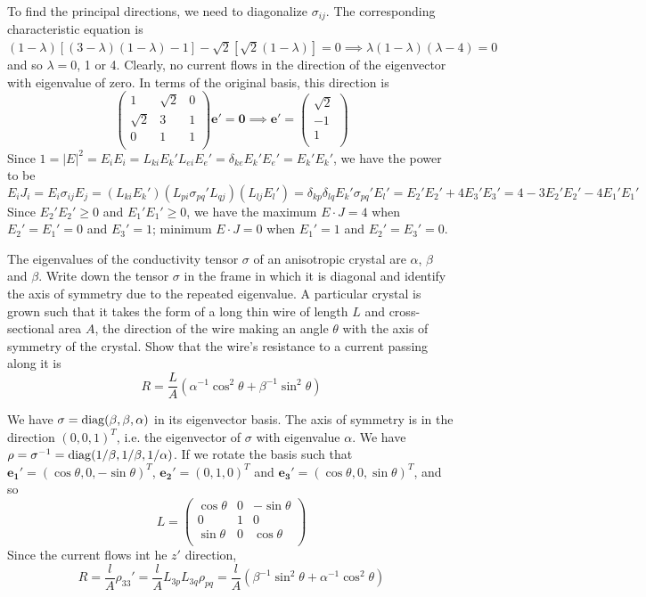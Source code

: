 \documentclass[a4paper]{article}
\begin{document}
\begin{ans}
To find the principal directions, we need to diagonalize $\sigma_{ij}$. The corresponding characteristic equation is $(1-\lambda)[(3-\lambda)(1-\lambda)-1]-\sqrt{2}[\sqrt{2}(1-\lambda)]=0\implies \lambda(1-\lambda)(\lambda-4)=0$ and so $\lambda=0$, 1 or 4. Clearly, no current flows in the direction of the eigenvector with eigenvalue of zero. In terms of the original basis, this direction is
$$\begin{pmatrix}1&\sqrt{2}&0\\\sqrt{2}&3&1\\0&1&1\\\end{pmatrix}\mathbf{e'}=\boldsymbol{0}\implies\mathbf{e'}=\begin{pmatrix}\sqrt{2}\\-1\\1\\\end{pmatrix}$$
Since $1=|E|^2=E_iE_i=L_{ki}E_k'L_{ei}E_e'=\delta_{ke}E_k'E_e'=E_k'E_k'$, we have the power to be
$$E_iJ_i=E_i\sigma_{ij}E_j=(L_{ki}E_k')(L_{pi}\sigma_{pq}'L_{qj})(L_{lj}E_l')=\delta_{kp}\delta_{lq}E_k'\sigma_{pq}'E_l'=E_2'E_2'+4E_3'E_3'=4-3E_2'E_2'-4E_1'E_1'$$
Since $E_2'E_2'\geq0$ and $E_1'E_1'\geq0$, we have the maximum $E\cdot J=4$ when $E_2'=E_1'=0$ and $E_3'=1$; minimum $E\cdot J=0$ when $E_1'=1$ and $E_2'=E_3'=0$. 
\end{ans}
\begin{qns}
The eigenvalues of the conductivity tensor $\sigma$ of an anisotropic crystal are $\alpha$, $\beta$ and $\beta$. Write down the tensor $\sigma$ in the frame in which it is diagonal and identify the axis of symmetry due to the repeated eigenvalue. A particular crystal is grown such that it takes the form of a long thin wire of length $L$ and cross-sectional area $A$, the direction of the wire making an angle $\theta$ with the axis of symmetry of the crystal. Show that the wire's resistance to a current passing along it is
$$R=\frac{L}{A}(\alpha^{-1}\cos^2\theta+\beta^{-1}\sin^2\theta)$$
\end{qns}
\begin{ans}
We have $\sigma=\operatorname{diag}(\beta,\beta,\alpha)$ in its eigenvector basis.  The axis of symmetry is in the direction $(0,0,1)^T$, i.e. the eigenvector of $\sigma$ with eigenvalue $\alpha$. We have $\rho=\sigma^{-1}=\operatorname{diag}(1/\beta,1/\beta,1/\alpha)$. If we rotate the basis such that $\mathbf{e_1'}=(\cos\theta,0,-\sin\theta)^T$, $\mathbf{e_2'}=(0,1,0)^T$ and $\mathbf{e_3'}=(\cos\theta,0,\sin\theta)^T$, and so
$$L=\begin{pmatrix}\cos\theta&0&-\sin\theta\\0&1&0\\\sin\theta&0&\cos\theta\\\end{pmatrix}$$
Since the current flows int he $z'$ direction,
$$R=\frac{l}{A}\rho_{33}'=\frac{l}{A}L_{3p}L_{3q}\rho_{pq}=\frac{l}{A}(\beta^{-1}\sin^2\theta+\alpha^{-1}\cos^2\theta)$$
\end{ans}
\end{document}
